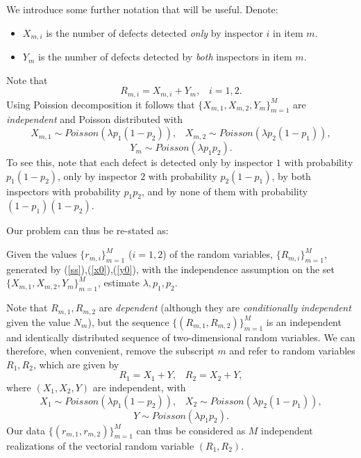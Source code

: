 \documentclass[a4paper,10pt,twoside]{article}
\begin{document}
We introduce some further notation that will be useful. Denote:
\begin{itemize}
	\item $X_{m,i}$ is the number of defects detected {\it{only}} by inspector $i$ in item $m$.
	
	\item $Y_m$ is the number of defects detected by {\it{both}} inspectors in item $m$.
\end{itemize}

Note that
\begin{equation}\label{ss}
R_{m,i}=X_{m,i}+Y_m,\;\;\;i=1,2.
\end{equation}
Using Poission decomposition it follows that $\{X_{m,1},X_{m,2},Y_m\}_{m=1}^M$ are {\it{independent}} and Poisson distributed with
\begin{equation}\label{x0}X_{m,1}\sim Poisson(\lambda p_1(1-p_2)),\;\;\;X_{m,2}\sim Poisson(\lambda p_2(1-p_1)),\end{equation}
\begin{equation}\label{y0}Y_{m}\sim Poisson(\lambda p_1p_2).\end{equation}
To see this, note that each defect is detected only by inspector $1$ with probability $p_1(1-p_2)$, only by inspector $2$ with probability $p_2(1-p_1)$, by
both inspectors with probability $p_1p_2$, and by none of them with probability $(1-p_1)(1-p_2)$. 

Our problem can thus be re-stated as: 

\begin{center}
	Given the values $\{ r_{m,i}\}_{m=1}^M$ ($i=1,2$) of the random variables, $\{ R_{m,i}\}_{m=1}^M$, 
	generated by (\ref{ss}),(\ref{x0}),(\ref{y0}), with the independence assumption on the set $\{X_{m,1},X_{m,2},Y_m\}_{m=1}^M$,
	estimate $\lambda,p_1,p_2$.
\end{center}

Note that $R_{m,1},R_{m,2}$ are {\it{dependent}} (although they are {\it{conditionally independent}} given the value $N_m$),
but the sequence  $\{(R_{m,1},R_{m,2})\}_{m=1}^M$ is an independent and identically distributed sequence of two-dimensional 
random variables. We can therefore, when convenient, remove the subscript $m$ and refer to random variables $R_1,R_2$, which are given by
$$R_1=X_1+Y,\;\;\;R_2=X_2+Y,$$
where $(X_1,X_2,Y)$ are independent, with
\begin{equation}\label{x}X_{1}\sim Poisson(\lambda p_1(1-p_2)),\;\;\;X_{2}\sim Poisson(\lambda p_2(1-p_1)),\end{equation}
\begin{equation}\label{y}Y\sim Poisson(\lambda p_1p_2).\end{equation}
Our data $\{(r_{m,1},r_{m,2})\}_{m=1}^M$ can thus be considered as $M$ independent realizations of the vectorial random variable $(R_1,R_2)$.
\end{document}
